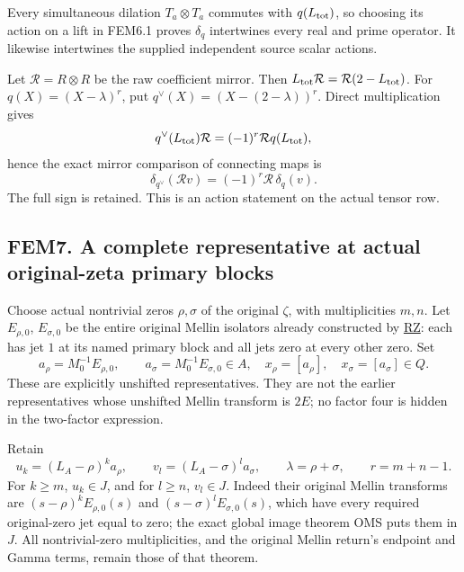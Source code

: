 Every simultaneous dilation \(T_a\otimes T_a\) commutes with
\(q(L_{\rm tot})\), so choosing its action on a lift in FEM6.1 proves
\(\delta_q\) intertwines every real and prime operator. It likewise
intertwines the supplied independent source scalar actions.

Let \(\mathcal R=R\otimes R\) be the raw coefficient mirror. Then
\(L_{\rm tot}\mathcal R=\mathcal R(2-L_{\rm tot})\). For
\(q(X)=(X-\lambda)^r\), put \(q^\vee(X)=(X-(2-\lambda))^r\). Direct
multiplication gives \[
q^\vee(L_{\rm tot})\mathcal R
=(-1)^r\mathcal R q(L_{\rm tot}),
\] hence the exact mirror comparison of connecting maps is \[
\delta_{q^\vee}(\mathcal Rv)
=(-1)^r\mathcal R\,\delta_q(v).
\tag{FEM6.3}
\] The full sign is retained. This is an action statement on the actual
tensor row.

\subsection{FEM7. A complete representative at actual original-zeta
primary
blocks}\label{fem7.-a-complete-representative-at-actual-original-zeta-primary-blocks}

Choose actual nontrivial zeros \(\rho,\sigma\) of the original
\(\zeta\), with multiplicities \(m,n\). Let \(E_{\rho,0}\),
\(E_{\sigma,0}\) be the entire original Mellin isolators already
constructed by
\href{https://github.com/KokunoYumeto/zeta-function-research-reader/blob/36a82ecca98addb8a98b48204e349737856c7223/workbenches/splitzero-tandem/continuations/20260924-cohomology-weight-and-character-lifts/gct-weight-control/proofs/ORIGINAL_ZETA_RESOLVENT_AND_PROJECTORS.md}{RZ}:
each has jet \(1\) at its named primary block and all jets zero at every
other zero. Set \[
a_\rho=M_0^{-1}E_{\rho,0},\qquad
a_\sigma=M_0^{-1}E_{\sigma,0}\in A,
\quad x_\rho=[a_\rho],\quad x_\sigma=[a_\sigma]\in Q.
\tag{FEM7.1}
\] These are explicitly unshifted representatives. They are not the
earlier representatives whose unshifted Mellin transform is \(2E\); no
factor four is hidden in the two-factor expression.

Retain \[
u_k=(L_A-\rho)^k a_\rho,\qquad
v_l=(L_A-\sigma)^l a_\sigma,\qquad
\lambda=\rho+\sigma,\qquad r=m+n-1.
\] For \(k\geq m\), \(u_k\in J\), and for \(l\geq n\), \(v_l\in J\).
Indeed their original Mellin transforms are \((s-\rho)^kE_{\rho,0}(s)\)
and \((s-\sigma)^lE_{\sigma,0}(s)\), which have every required
original-zero jet equal to zero; the exact global image theorem OMS puts
them in \(J\). All nontrivial-zero multiplicities, and the original
Mellin return's endpoint and Gamma terms, remain those of that theorem.

